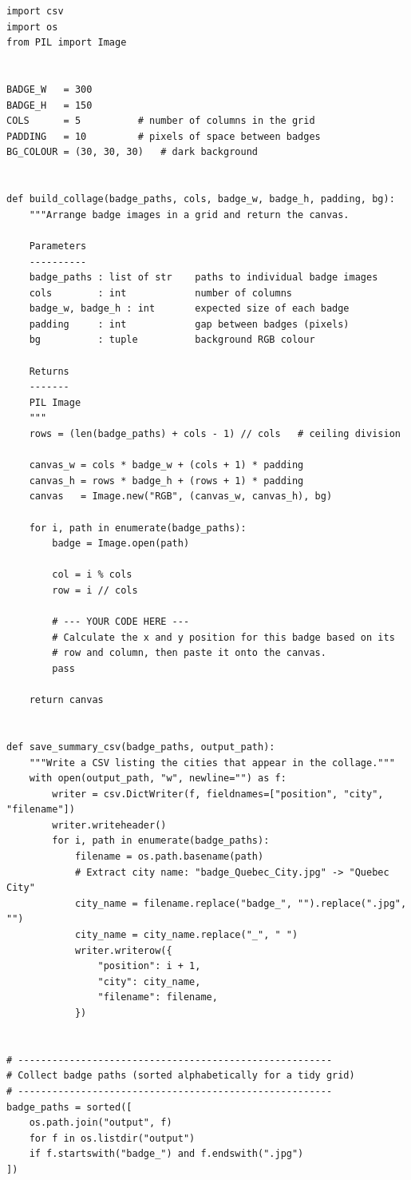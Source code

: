 \documentclass{cslab}
\begin{document}
\begin{lstlisting}
import csv
import os
from PIL import Image


BADGE_W   = 300
BADGE_H   = 150
COLS      = 5          # number of columns in the grid
PADDING   = 10         # pixels of space between badges
BG_COLOUR = (30, 30, 30)   # dark background


def build_collage(badge_paths, cols, badge_w, badge_h, padding, bg):
    """Arrange badge images in a grid and return the canvas.

    Parameters
    ----------
    badge_paths : list of str    paths to individual badge images
    cols        : int            number of columns
    badge_w, badge_h : int       expected size of each badge
    padding     : int            gap between badges (pixels)
    bg          : tuple          background RGB colour

    Returns
    -------
    PIL Image
    """
    rows = (len(badge_paths) + cols - 1) // cols   # ceiling division

    canvas_w = cols * badge_w + (cols + 1) * padding
    canvas_h = rows * badge_h + (rows + 1) * padding
    canvas   = Image.new("RGB", (canvas_w, canvas_h), bg)

    for i, path in enumerate(badge_paths):
        badge = Image.open(path)

        col = i % cols
        row = i // cols

        # --- YOUR CODE HERE ---
        # Calculate the x and y position for this badge based on its
        # row and column, then paste it onto the canvas.
        pass

    return canvas


def save_summary_csv(badge_paths, output_path):
    """Write a CSV listing the cities that appear in the collage."""
    with open(output_path, "w", newline="") as f:
        writer = csv.DictWriter(f, fieldnames=["position", "city", "filename"])
        writer.writeheader()
        for i, path in enumerate(badge_paths):
            filename = os.path.basename(path)
            # Extract city name: "badge_Quebec_City.jpg" -> "Quebec City"
            city_name = filename.replace("badge_", "").replace(".jpg", "")
            city_name = city_name.replace("_", " ")
            writer.writerow({
                "position": i + 1,
                "city": city_name,
                "filename": filename,
            })


# -------------------------------------------------------
# Collect badge paths (sorted alphabetically for a tidy grid)
# -------------------------------------------------------
badge_paths = sorted([
    os.path.join("output", f)
    for f in os.listdir("output")
    if f.startswith("badge_") and f.endswith(".jpg")
])


\end{lstlisting}
\end{document}
